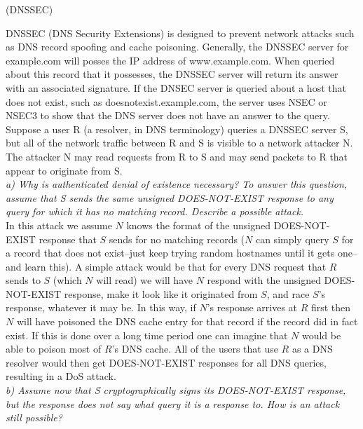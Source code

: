 \begin{prob}  (DNSSEC) 
\end{prob}

\noindent DNSSEC (DNS Security Extensions) is designed to prevent network attacks such as DNS record spoofing and cache poisoning. Generally, the DNSSEC server for example.com will posses the IP address of www.example.com. When queried about this record that it possesses, the DNSSEC server will return its answer with an associated signature. If the DNSEC server is queried about a host that does not exist, such as doesnotexist.example.com, the server uses NSEC or NSEC3 to show that the DNS server does not have an answer to the query.\\
\indent Suppose a user R (a resolver, in DNS terminology) queries a DNSSEC server S, but all of the network traffic between R and S is visible to a network attacker N. The attacker N may read requests from R to S and may send packets to R that appear to originate from S.\\

\noindent \textit{a) Why is authenticated denial of existence necessary? To answer this question, assume that S sends the same unsigned DOES-NOT-EXIST response to any query for which it has no matching record. Describe a possible attack.}\\

In this attack we assume $N$ knows the format of the unsigned DOES-NOT-EXIST response that $S$ sends for no matching records ($N$ can simply query $S$ for a record that does not exist--just keep trying random hostnames until it gets one--and learn this). A simple attack would be that for every DNS request that $R$ sends to $S$ (which $N$ will read) we will have $N$ respond with the unsigned DOES-NOT-EXIST response, make it look like it originated from $S$, and race $S$'s response, whatever it may be. In this way, if $N$'s response arrives at $R$ first then $N$ will have poisoned the DNS cache entry for that record if the record did in fact exist. If this is done over a long time period one can imagine that $N$ would be able to poison most of $R$'s DNS cache. All of the users that use $R$ as a DNS resolver would then get DOES-NOT-EXIST responses for all DNS queries, resulting in a DoS attack. \\

\noindent \textit{b) Assume now that S cryptographically signs its DOES-NOT-EXIST response, but the response does not say what query it is a response to. How is an attack still possible?}\\


